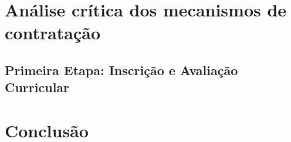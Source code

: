 \chapter[Crítica]{Análise crítica dos mecanismos de contratação}

\section{Primeira Etapa: Inscrição e Avaliação Curricular}

\lipsum[2]


\chapter*[Conclusão]{Conclusão}

\lipsum[4]